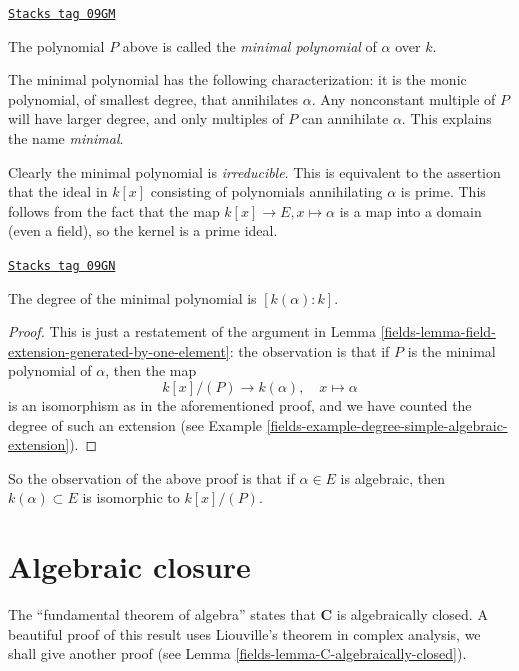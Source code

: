 \begin{definition}
\label{fields-definition-minimal-polynomial}
\href{https://stacks.math.columbia.edu/tag/09GM}{\texttt{Stacks tag 09GM}}

The polynomial $P$ above is called the {\it minimal polynomial}
of $\alpha$ over $k$.
\end{definition}

The minimal polynomial has the following characterization: it is the monic
polynomial, of smallest degree, that annihilates $\alpha$. Any nonconstant
multiple of $P$ will have larger degree, and only multiples of $P$ can
annihilate $\alpha$. This explains the name {\it minimal}.

\medskip\noindent
Clearly the minimal polynomial is {\it irreducible}. This is equivalent to the
assertion that the ideal in $k[x]$ consisting of polynomials annihilating
$\alpha$ is prime. This follows from the fact that the map
$k[x] \to E, x \mapsto \alpha$ is a map into a domain (even a field), so the
kernel is a prime ideal.

\begin{lemma}
\label{fields-lemma-degree-minimal-polynomial}
\href{https://stacks.math.columbia.edu/tag/09GN}{\texttt{Stacks tag 09GN}}

The degree of the minimal polynomial is $[k(\alpha) : k]$.
\end{lemma}

\begin{proof}

This is just a restatement of the argument in
Lemma \ref{fields-lemma-field-extension-generated-by-one-element}: the observation
is that if $P$ is the minimal polynomial of $\alpha$, then the map
$$
k[x]/(P) \to k(\alpha), \quad x \mapsto \alpha
$$
is an isomorphism as in the aforementioned proof, and we have counted the
degree of such an extension (see
Example \ref{fields-example-degree-simple-algebraic-extension}).
\end{proof}

So the observation of the above proof is that if $\alpha \in E$ is algebraic,
then $k(\alpha) \subset E$ is isomorphic to $k[x]/(P)$.

\section{Algebraic closure}
\label{fields-section-algebraic-closure}
The ``fundamental theorem of algebra'' states that $\mathbf{C}$ is
algebraically closed. A beautiful proof of this result uses
Liouville's theorem in complex analysis, we shall give another
proof (see Lemma \ref{fields-lemma-C-algebraically-closed}).

